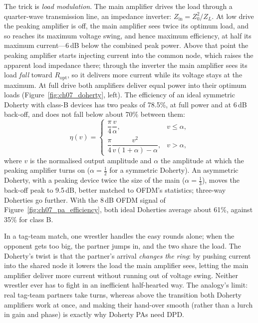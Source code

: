 The trick is \emph{load modulation}. The main amplifier drives the load through a
quarter-wave transmission line, an impedance inverter: $Z_{\text{in}}=Z_0^2/Z_L$. At low drive the peaking
amplifier is off, the main amplifier sees twice its optimum load, and so reaches its maximum voltage swing,
and hence maximum efficiency, at half its maximum current---6\,dB below the combined peak power. Above that
point the peaking amplifier starts injecting current into the common node, which raises the apparent load
impedance there; through the inverter the main amplifier sees its load \emph{fall} toward $R_{\text{opt}}$,
so it delivers more current while its voltage stays at the maximum. At full drive both amplifiers deliver
equal power into their optimum loads (Figure~\ref{fig:ch07_doherty}, left). The efficiency of an ideal
symmetric Doherty with class-B devices has two peaks of 78.5\%, at full power and at 6\,dB back-off, and
does not fall below about 70\% between them:
\begin{equation}
\eta(v)=\begin{cases}\dfrac{\pi}{4}\dfrac{v}{\alpha}, & v\le\alpha,\\[2ex]
\dfrac{\pi}{4}\dfrac{v^2}{v(1+\alpha)-\alpha}, & v>\alpha,\end{cases}
\label{eq:ch07:doherty}
\end{equation}
where $v$ is the normalised output amplitude and $\alpha$ the amplitude at which the peaking amplifier
turns on ($\alpha=\tfrac12$ for a symmetric Doherty). An asymmetric Doherty, with a peaking device twice
the size of the main ($\alpha=\tfrac13$), moves the back-off peak to 9.5\,dB, better matched to OFDM's
statistics; three-way Doherties go further. With the 8\,dB OFDM signal of
Figure~\ref{fig:ch07_pa_efficiency}, both ideal Doherties average about 61\%, against 35\% for class B.

\begin{analogy}
In a tag-team match, one wrestler handles the easy rounds alone; when the opponent gets too big, the
partner jumps in, and the two share the load. The Doherty's twist is that the partner's arrival
\emph{changes the ring}: by pushing current into the shared node it lowers the load the main amplifier
sees, letting the main amplifier deliver more current without running out of voltage swing. Neither
wrestler ever has to fight in an inefficient half-hearted way. The analogy's limit: real tag-team
partners take turns, whereas above the transition both Doherty amplifiers work at once, and making
their hand-over smooth (rather than a lurch in gain and phase) is exactly why Doherty PAs need DPD.
\end{analogy}

